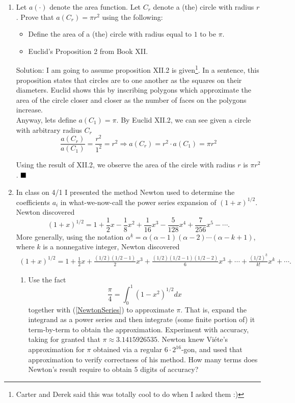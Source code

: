 \documentclass[10pt]{article}
\newcommand{\solution}{\color{blue} Solution: \color{black}}
\begin{document}
\begin{enumerate}
		\item Let $a(\cdot)$ denote the area function.  Let $C_r$ denote a (the) circle with radius $r$. Prove that $a(C_r) = \pi r^2$ using the following:
		\begin{itemize}
			\item Define the area of a (the) circle with radius equal to $1$ to be $\pi$.
			\item Euclid's Proposition 2 from Book XII.
		\end{itemize}

        \solution I am going to assume proposition XII.2 is given\footnote{Carter and Derek said this was totally cool to do when I asked them :)}. In a sentence, this proposition states that circles are to one another as the squares on their diameters. Euclid shows this by inscribing polygons which approximate the area of the circle closer and closer as the number of faces on the polygons increase.\\

        Anyway, lets define $a(C_1) = \pi$. By Euclid XII.2, we can see given a circle with arbitrary radius $C_r$
        \[\frac{a(C_r)}{a(C_1)} = \frac{r^2}{1^2} = r^2 \Rightarrow a(C_r) = r^2 \cdot a(C_1) = \pi r^2\]

        Using the result of XII.2, we observe the area of the circle with radius $r$ is $\pi r^2$. $\hfill\blacksquare$
		
		\item \noindent In class on 4/1 I presented the method Newton used to determine the coefficients $a_i$ in what-we-now-call the power series expansion of $(1+x)^{1/2}$. Newton discovered 
		$$(1+x)^{1/2} = 1 + \frac{1}{2}x - \frac{1}{8}x^2 + \frac{1}{16}x^3 -\frac{5}{128}x^4 + \frac{7}{256}x^5 - \cdots.$$
		More generally, using the notation $\alpha^{\underline{k}} = \alpha(\alpha -1)(\alpha -2)\cdots (\alpha - k + 1)$, where $k$ is a nonnegative integer, Newton discovered 
		\begin{eqnarray}(1+x)^{1/2} = 1 + \frac{1}{2}x + \frac{(1/2)(1/2-1)}{2}x^3 + \frac{(1/2)(1/2-1)(1/2-2)}{6}x^3 + \cdots + \frac{(1/2)^{\underline{k}}}{k!}x^k+ \cdots. \label{NewtonSeries}
		\end{eqnarray}
		
		
		
		\begin{enumerate}
			
			\item Use the fact $$\frac{\pi}{4} = \int_0^1 (1-x^2)^{1/2}dx$$
			together with (\ref{NewtonSeries}) to approximate $\pi$.  
			That is, expand the integrand as a power series and then integrate (some finite portion of) it term-by-term to obtain the approximation.  Experiment with accuracy, taking for granted that 
			$\pi \approx 3.1415926535$.  
			Newton knew Vi\'{e}te's approximation for $\pi$ obtained via a regular $6\cdot 2^{16}$-gon, and used that approximation to verify correctness of his method.  How many terms does Newton's result require to obtain $5$ digits of accuracy? 


\end{enumerate}
\end{enumerate}
\end{document}
